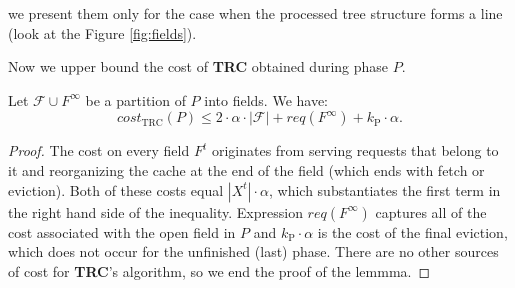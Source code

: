 we present them only for the case when the processed tree structure forms a line
(look at the Figure \ref{fig:fields}).

Now we upper bound the cost of \textbf{TRC} obtained during phase $P$.
\begin{lemma} Let $\mathcal{F} \cup F^{\infty}$ be a partition of $P$ into
fields. We have: $$cost_{\mathrm{TRC}}(P) \leq 2 \cdot \alpha \cdot
|\mathcal{F}| + req(F^{\infty}) + k_{\mathrm{P}} \cdot \alpha.$$ \label{thm:trc_cost}
\end{lemma} \begin{proof} The cost on every field $F^t$ originates from serving
requests that belong to it and reorganizing the cache at the end of the field
(which ends with fetch or eviction). Both of these costs equal $|X^t| \cdot
\alpha$, which substantiates the first term in the right hand side of the inequality.
Expression $req(F^{\infty})$ captures all of the cost associated with the open
field in $P$ and $k_{\mathrm{P}} \cdot \alpha$ is the cost of the final eviction, which
does not occur for the unfinished (last) phase. There are no other sources of
cost for \textbf{TRC}'s algorithm, so we end the proof of the lemmma.
\end{proof}

